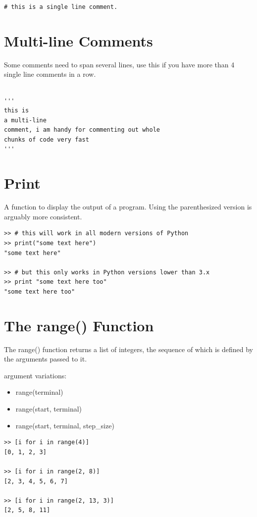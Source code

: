 \documentclass[12pt,a4paper,final,twoside,onecolumn,titlepage]{book}
\begin{document}
\begin{lstlisting}
# this is a single line comment.
\end{lstlisting}

\section{Multi-line Comments}

Some comments need to span several lines, use this if you have more than 4 single line comments in a row.
\begin{lstlisting}

'''
this is
a multi-line
comment, i am handy for commenting out whole
chunks of code very fast
'''
\end{lstlisting}

\section{Print}

A function to display the output of a program. Using the parenthesized version is arguably more consistent.

\begin{lstlisting}
>> # this will work in all modern versions of Python
>> print("some text here")
"some text here"

>> # but this only works in Python versions lower than 3.x
>> print "some text here too"
"some text here too"
\end{lstlisting}

\section{The range() Function}

The range() function returns a list of integers, the sequence of which is defined by the arguments passed to it.

argument variations:
\begin{itemize}
\item range(terminal)
\item range(start, terminal)
\item range(start, terminal, step\_size)
\end{itemize}

\begin{lstlisting}
>> [i for i in range(4)]
[0, 1, 2, 3]

>> [i for i in range(2, 8)]
[2, 3, 4, 5, 6, 7]

>> [i for i in range(2, 13, 3)]
[2, 5, 8, 11]
\end{lstlisting}
\end{document}
